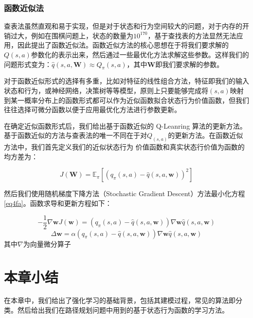 \documentclass{standalone}
\begin{document}
\subsubsection{函数近似法}
查表法虽然直观和易于实现，但是对于状态和行为空间较大的问题，对于内存的开销过大，例如在围棋问题上，状态的数量为$10^{170}$，基于查找表的方法显然无法应用，因此提出了函数近似法。函数近似方法的核心思想在于将我们要求解的$Q(s, a)$参数化的表示出来，然后通过一些最优化方法求解这些参数。这样我们的问题形式变为：$\hat{q}(s, a, \mathbf{W}) \approx Q_{\pi}(s, a)$，其中$\mathbf{W}$即我们要求解的参数。\par
对于函数近似形式的选择有多重，比如对特征的线性组合方法，特征即我们的输入状态和行为，或神经网络，决策树等等模型，原则上只要能够完成将$(s, a)$映射到某一概率分布上的函数形式都可以作为近似函数拟合状态行为价值函数，但我们往往选择可微分函数以便于应用最优化方法进行参数更新。\par
在确定近似函数形式后，我们给出基于函数近似的 Q-Leanring 算法的更新方法。基于函数近似的方法与查表法的唯一不同在于对$Q_(s, a)$的更新方法。在函数近似方法中，我们首先定义我们的近似状态行为 价值函数和真实状态行价值为函数的均方差为：
\begin{center}
    \begin{equation}
    \label{eq4fa}
        J(\mathbf{W}) = \mathbb{E}_{\pi}[(q_{\pi}(s,a) - \hat{q}(s, a, \mathbf{w}))^2]
    \end{equation}
\end{center}
然后我们使用随机梯度下降方法（Stochastic Gradient Descent）方法最小化方程 \ref{eq4fa}。函数求导和更新方程如下：
\begin{center}
    \begin{equation}
        -\frac{1}{2}\nabla{\mathbf{w}}J(\mathbf{w}) = (q_{\pi}(s, a)-\hat{q}(s, a, \mathbf{w}))\nabla{\mathbf{w}} \hat{q}(s, a, \mathbf{w})
    \end{equation}
    \begin{equation}
        \Delta\mathbf{w} = \alpha(q_{\pi}(s, a) - \hat{q}(s, a, \mathbf{w}))\nabla{\mathbf{w}} \hat{q}(s, a, \mathbf{w})
    \end{equation}
    \mbox{其中$\nabla$为向量微分算子}
\end{center}

\section{本章小结}
在本章中，我们给出了强化学习的基础背景，包括其建模过程，常见的算法即分类。然后给出我们在路径规划问题中用到的基于状态行为函数的学习方法。
\end{document}
